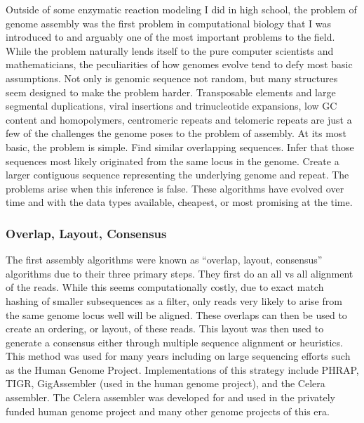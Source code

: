 \par{
Outside of some enzymatic reaction modeling I did in high school, the problem of genome assembly was the first problem in computational biology that I was introduced to and arguably one of the most important problems to the field. While the problem naturally lends itself to the pure computer scientists and mathematicians, the peculiarities of how genomes evolve tend to defy most basic assumptions. Not only is genomic sequence not random, but many structures seem designed to make the problem harder. Transposable elements and large segmental duplications, viral insertions and trinucleotide expansions, low GC content and homopolymers, centromeric repeats and telomeric repeats are just a few of the challenges the genome poses to the problem of assembly. At its most basic, the problem is simple. Find similar overlapping sequences. Infer that those sequences most likely originated from the same locus in the genome. Create a larger contiguous sequence representing the underlying genome and repeat. The problems arise when this inference is false. These algorithms have evolved over time and with the data types available, cheapest, or most promising at the time.
}
\subsubsection{Overlap, Layout, Consensus}

\par{
The first assembly algorithms were known as ``overlap, layout, consensus'' algorithms due to their three primary steps. They first do an all vs all alignment of the reads. While this seems computationally costly, due to exact match hashing of smaller subsequences as a filter, only reads very likely to arise from the same genome locus well will be aligned\cite{OLC}. These overlaps can then be used to create an ordering, or layout, of these reads. This layout was then used to generate a consensus either through multiple sequence alignment or heuristics\cite{gene1}. This method was used for many years including on large sequencing efforts such as the Human Genome Project\cite{genomeproject}. Implementations of this strategy include PHRAP\cite{phrap}, TIGR\cite{tigr}, GigAssembler\cite{gigassembler} (used in the human genome project), and the Celera assembler\cite{Myers2000}. The Celera assembler was developed for and used in the privately funded human genome project\cite{privategenome} and many other genome projects of this era.
}

